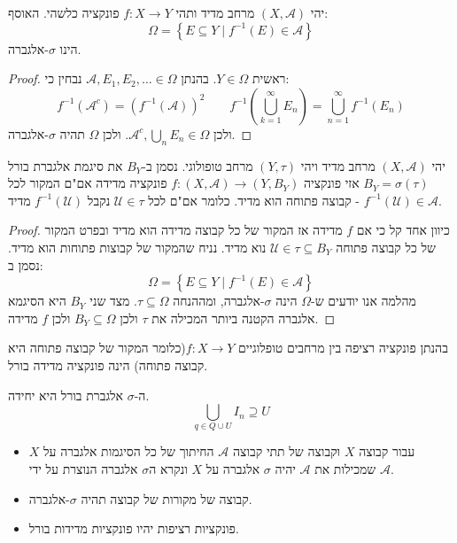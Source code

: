 \documentclass{tstextbook}
\begin{document}
\begin{lemma}
יהי \((X,\mathcal{A})\) מרחב מדיד ותהי \(f: X\to Y\) פונקציה כלשהי. האוסף:
$$\Omega=\left\{  E\subseteq Y \mid f^{-1}(E) \in \mathcal{A}  \right\}$$
הינו \(\sigma\)-אלגברה.

\end{lemma}
\begin{proof}
ראשית \(Y \in \Omega\). בהנתן \(\mathcal{A}, E_{1},E_{2},\dots \in \Omega\) נבחין כי:
$$f^{-1}(\mathcal{A}^{c})=(f^{-1}(\mathcal{A}))^{2}\qquad f^{-1}\left( \bigcup_{k=1}^{\infty} E_{n} \right)=\bigcup_{n=1}^{\infty }f^{-1}(E_{n})$$
ולכן \(\mathcal{A}^{c},\bigcup_{n}E_{n}\in \Omega\). ולכן \(\Omega\) תהיה \(\sigma\)-אלגברה.

\end{proof}
\begin{proposition}
יהי \((X,\mathcal{A})\) מרחב מדיד ויהי \(\left( Y,\tau \right)\) מרחב טופולוגי. נסמן ב-\(B_Y\) את סיגמת אלגברת בורל \(B_{Y}=\sigma\left( \tau \right)\) אזי פונקציה \(f:(X,\mathcal{A})\to (Y,B_{Y})\) פונקציה מדידה אם"ם המקור לכל קבוצה פתוחה הוא מדיד. כלומר אם"ם לכל \(\mathcal{U}\in \tau\) נקבל \(f^{-1}\left( \mathcal{ U} \right)\) מדיד - \(f^{-1}\left( \mathcal{U}  \right)\in \mathcal{A}\).

\end{proposition}
\begin{proof}
כיוון אחד קל כי אם \(f\) מדידה אז המקור של כל קבוצה מדידה הוא מדיד ובפרט המקור של כל קבוצה פתוחה \(\mathcal{ U}\in \tau \subseteq B_{Y}\) נוא מדיד. נניח שהמקור של קבוצות פתוחות הוא מדיד. נסמן ב:
$$\Omega = \left\{   E\subseteq Y \mid f^{-1} (E)\in \mathcal{A} \right\} $$
מהלמה אנו יודעים ש-\(\Omega\) הינה \(\sigma\)-אלגברה, ומההנחה \(\tau \subseteq \Omega\). מצד שני \(B_{Y}\) היא הסיגמא אלגברה הקטנה ביותר המכילה את \(\tau\) ולכן \(B_{Y}\subseteq \Omega\) ולכן \(f\) מדידה.

\end{proof}
\begin{corollary}
בהנתן פונקציה רציפה בין מרחבים טופלוגיים \(f:X\to Y\)(כלומר המקור של קבוצה פתוחה היא קבוצה פתוחה) הינה פונקציה מדידה בורל.

\end{corollary}
\begin{remark}
ה-\(\sigma\) אלגברת בורל היא יחידה.
$$\bigcup_{q\in Q\cup U} I_n \supseteq U$$

\end{remark}
\begin{summary}
  \begin{itemize}
    \item עבור קבוצה \(X\) וקבוצה של תתי קבוצה \(\mathcal{A}\) החיתוך של כל הסיגמות אלגברה על \(X\) שמכילות את \(\mathcal{A}\) יהיה \(\sigma\) אלגברה על \(X\) ונקרא ה\(\sigma\)  אלגברה הנוצרת על ידי \(\mathcal{A}\).
    \item קבוצה של מקורות של קבוצה תהיה \(\sigma\)-אלגברה.
    \item פונקציות רציפות יהיו פונקציות מדידות בורל.
  \end{itemize}
\end{summary}
\end{document}
